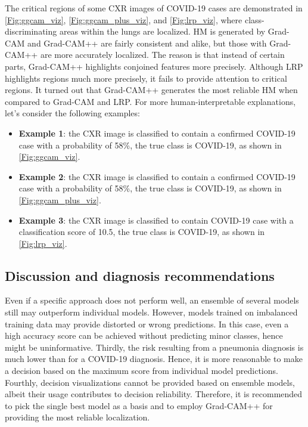 \documentclass[conference]{IEEEtran}
\begin{document}
The critical regions of some CXR images of COVID-19 cases are demonstrated in \cref{Fig:ggcam_viz}, \cref{Fig:ggcam_plus_viz}, and \cref{Fig:lrp_viz}, where class-discriminating areas within the lungs are localized.
HM is generated by Grad-CAM and Grad-CAM++ are fairly consistent and alike, but those with Grad-CAM++ are more accurately localized. The reason is that instead of certain parts, Grad-CAM++ highlights conjoined features more precisely.
Although LRP highlights regions much more precisely, it fails to provide attention to critical regions. It turned out that Grad-CAM++ generates the most reliable HM when compared to Grad-CAM and LRP. For more human-interpretable explanations, let's consider the following examples: 

\begin{itemize}
    \item \textbf{Example 1}: the CXR image is classified to contain a confirmed COVID-19 case with a probability of 58\%, the true class is COVID-19, as shown in \cref{Fig:ggcam_viz}. 
    \item \textbf{Example 2}: the CXR image is classified to contain a confirmed COVID-19 case with a probability of 58\%, the true class is COVID-19, as shown in \cref{Fig:ggcam_plus_viz}. 
    \item \textbf{Example 3}: the CXR image is classified to contain COVID-19 case with a classification score of 10.5, the true class is COVID-19, as shown in \cref{Fig:lrp_viz}.
\end{itemize}

\subsection{Discussion and diagnosis recommendations}
Even if a specific approach does not perform well, an ensemble of several models still may outperform individual models. However, models trained on imbalanced training data may provide distorted or wrong predictions. In this case, even a high accuracy score can be achieved without predicting minor classes, hence might be uninformative. 
Thirdly, the risk resulting from a pneumonia diagnosis is much lower than for a COVID-19 diagnosis. Hence, it is more reasonable to make a decision based on the maximum score from individual model predictions. Fourthly, decision visualizations cannot be provided based on ensemble models, albeit their usage contributes to decision reliability. Therefore, it is recommended to pick the single best model as a basis and to employ Grad-CAM++ for providing the most reliable localization. 
\end{document}
